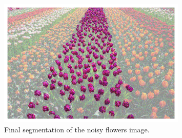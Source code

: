 \documentclass[11pt]{article}
\begin{document}
\begin{figure}[H]
    \centering
    \includegraphics[width=0.8\textwidth]{figs/q1b_final_mask.png}
    \caption{Final segmentation of the noisy flowers image.}
    \label{fig:q1b_final_mask}
\end{figure}
\end{document}
